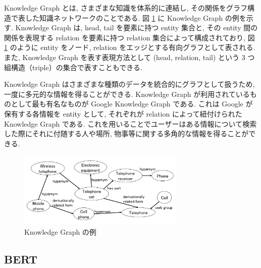 \documentclass[twocolumn]{jarticle}
\begin{document}
Knowledge Graph \cite{kg} とは, さまざまな知識を体系的に連結し, その関係をグラフ構造で表した知識ネットワークのことである. 図 \ref{kg} に Knowledge Graph の例を示す. Knowledge Graph は, head, tail を要素に持つ entity 集合と, その entity 間の関係を表現する relation を要素に持つ relation 集合によって構成されており, 図 \ref{kg} のように entity をノード, relation をエッジとする有向グラフとして表される. また, Knowledge Graph を表す表現方法として (head, relation, tail) という 3 つ組構造（triple）の集合で表すこともできる. \par
Knowledge Graph はさまざまな種類のデータを統合的にグラフとして扱うため, 一度に多元的な情報を得ることができる. Knowledge Graph が利用されているものとして最も有名なものが Google Knowledge Graph \cite{google_knowledge_graph} である. これは Google が保有する各情報を entity として, それぞれが relation によって紐付けられた Knowledge Graph である. これを用いることでユーザーはある情報について検索した際にそれに付随する人や場所, 物事等に関する多角的な情報を得ることができる. \par

\begin{figure}[t]
    \centering
    \includegraphics[width=80mm]{assets/Ex_KG.png}
    \vspace{-4mm}
    \caption{Knowledge Graph の例}
    \label{kg}
\end{figure}

\vspace{-1mm}
\subsection{BERT}
\end{document}
